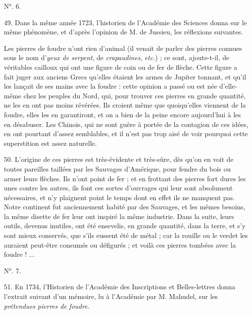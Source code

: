 \documentclass[a4paper, 11pt, oneside, polutonikogreek, french]{article}
\begin{document}
\begin{center}
N°. 6.
\end{center}

49. Dans la même année 1723, l'historien de l'Académie des Sciences donna sur le même phénomène, et d'après l'opinion de M. de Jussieu, les réflexions suivantes.

\og Les pierres de foudre n'ont rien d'animal (il venait de parler des pierres connues sous le nom d'\emph{yeux de serpent}, de \emph{crapaudines}, \emph{etc.}) ; ce sont, ajoute-t-il, de véritables cailloux qui ont une figure de coin ou de fer de flèche. Cette figure a fait juger aux anciens Grecs qu'elles étaient les armes de Jupiter tonnant, et qu'il les lançait de ses mains avec la foudre : cette opinion a passé ou est née d'elle-même chez les peuples du Nord, qui, pour trouver ces pierres en grande quantité, ne les en ont pas moins révérées. Ils croient même que quoiqu'elles viennent de la foudre, elles les en garantiront, et on a bien de la peine encore aujourd'hui à les en désabuser. Les Chinois, qui ne sont guère à portée de la contagion de ces idées, en ont pourtant d'assez semblables, et il n'est pas trop aisé de voir pourquoi cette superstition est assez naturelle. \fg

50. L'origine de ces pierres est très-évidente et très-sûre, dès qu'on en voit de toutes pareilles taillées par les Sauvages d'Amérique, pour fendre du bois ou armer leurs flèches. Ils n'ont point de fer ; et en frottant des pierres fort dures les unes contre les autres, ils font ces sortes d'ouvrages qui leur sont absolument nécessaires, et n'y plaignent point le temps dont en effet ils ne manquent pas. Notre continent fut anciennement habité par des Sauvages, et les mêmes besoins, la même disette de fer leur ont inspiré la même industrie. Dans la suite, leurs outils, devenus inutiles, ont été ensevelis, en grande quantité, dans la terre, et s'y sont mieux conservés, que s'ils eussent été de métal ; car la rouille ou le verdet les auraient peut-être consumés ou défigurés ; et voilà ces pierres tombées avec la foudre ! ...

\begin{center}
N°. 7.
\end{center}

51. En 1734, l'Historien de l'Académie des Inscriptions et Belles-lettres donna l'extrait suivant d'un mémoire, lu à l'Académie par M. Mahudel, sur les \emph{prétendues pierres de foudre}.
\end{document}

